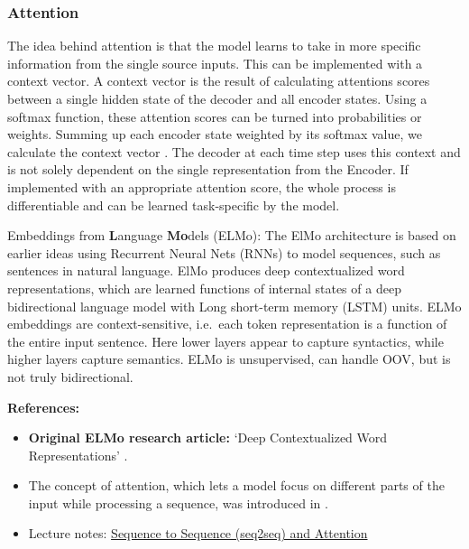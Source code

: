 \documentclass[11pt, a4paper]{amsart}
\begin{document}
\subsubsection{Attention}

The idea behind attention is that the model learns to take in more specific information from the single source inputs. 
This can be implemented with a context vector. 
A context vector is the result of calculating attentions scores between a single hidden state of the decoder and all encoder states. 
Using a softmax function, these attention scores can be turned into probabilities or weights. 
Summing up each encoder state weighted by its softmax value, we calculate the context vector \cite{DBLP:journals/corr/BahdanauCB14}.
The decoder at each time step uses this context and is not solely dependent on the single representation from the Encoder. 
If implemented with an appropriate attention score, the whole process is differentiable and can be learned task-specific by the model.

{
	\color{blue}
	
	{E}mbeddings from \textbf{L}anguage \textbf{Mo}dels (ELMo):
	The ElMo architecture is based on earlier ideas using Recurrent Neural Nets (RNNs) to model sequences, such as sentences in natural language.
	ElMo produces deep contextualized word representations, which are learned functions of internal states of a deep bidirectional language model with Long short-term memory (LSTM) units.
	ELMo embeddings are context-sensitive, i.e.\ each token representation is a function of the entire input sentence.
	Here lower layers appear to capture syntactics, while higher layers capture semantics.
	ELMo is unsupervised, can handle OOV, but is not truly bidirectional.
} %

\noindent \textbf{References:}
\begin{itemize}
	\item \textbf{Original ELMo research article:} `Deep Contextualized Word Representations' \cite{DBLP:journals/corr/abs-1802-05365}.
	\item The concept of attention, which lets a model focus on different parts of the input while processing a sequence, was introduced in \cite{garg-etal-2019-jointly}.
	\item Lecture notes: \href{https://lena-voita.github.io/nlp_course/seq2seq_and_attention.html}{Sequence to Sequence (seq2seq) and Attention}
\end{itemize}

\end{document}

